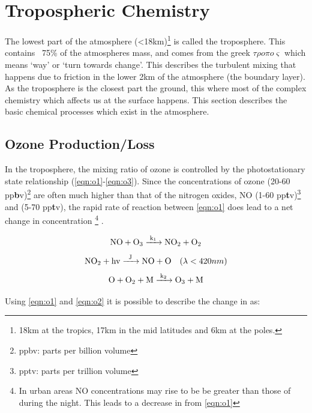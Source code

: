 \citep{failparis}



\section{Tropospheric Chemistry}

The lowest part of the atmosphere (<18km)\footnote{18km at the tropics, 17km in the mid latitudes and 6km at the poles. } is called the troposphere. This contains ~75\% of the atmospheres mass, and comes from the greek $\tau\rho o \pi o \varsigma$ which means `way' or `turn towards change'. This describes the turbulent mixing that happens due to friction in the lower 2km of the atmosphere (the boundary layer). As the troposphere is the closest part the ground, this where most of the complex chemistry which affects us at the surface happens. This section describes the basic chemical processes which exist in the atmosphere.




\subsection{Ozone Production/Loss}\label{sec:o3prod}
In the troposphere, the mixing ratio of ozone is controlled by the photostationary state relationship (\autoref{eqn:o1}-\ref{eqn:o3}).
Since the concentrations of ozone (20-60 pp\textbf{b}v)\footnote{ppbv: parts per billion volume} are often much higher than that of the nitrogen oxides, NO (1-60 pp\textbf{t}v)\footnote{pptv: parts per trillion volume} and  (5-70 pp\textbf{t}v), the rapid rate of reaction between \autoref{eqn:o1} does lead to a net change in  concentration \footnote{In urban areas NO concentrations may rise to be be greater than those of  during the night. This leads to a decrease in from \autoref{eqn:o1}} \citep{fundamentals}.



\begin{equation}
  \centering
\ce{NO + O3 ->[k1] NO2 +O2} \label{eqn:o1}
\end{equation}
\begin{equation}
  \centering
 \ce{NO2 + hv ->[J] NO + O }\ \ \ (\lambda < 420nm) \label{eqn:o2}
\end{equation}
 \begin{equation}
   \centering
\ce{O + O2 + M ->[k2] O3 + M}\label{eqn:o3}
\end{equation}

Using \autoref{eqn:o1} and \autoref{eqn:o2} it is possible to describe the change in  as:

